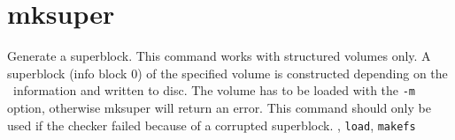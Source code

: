 \section{mksuper}
\begin{man}
  \PP Generate a superblock.
  \DE This command works with structured volumes only.
             A superblock (info block 0) of the specified volume is constructed
             depending on the \HEDI\ information and written to
             disc.
             The volume has to be loaded with the {\tt -m} option, otherwise
             mksuper will return an error.
             This command should only be used if the checker failed because of
             a corrupted superblock.
  , {\tt load}, {\tt makefs}
\end{man}
